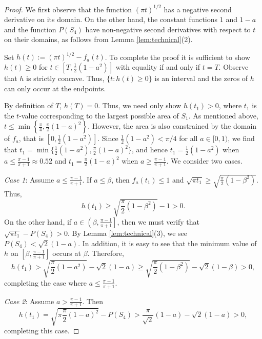 \documentclass[leqno]{article}
\numberwithin{equation}{section}
\theoremstyle{definition}
\theoremstyle{remark}
\theoremstyle{plain}
\begin{document}
\begin{proof} 
We first observe that the function $(\pi t)^{1/2}$ has a negative second derivative on its domain.  On the other hand, the constant functions $1$ and $1-a$ and the function $P(S_4)$ have non-negative second derivatives with respect to $t$ on their domains, as follows from Lemma \ref{lem:technical}(2).

Set $h(t):=(\pi t)^{1/2} - f_a(t)$.  To complete the proof it is sufficient to show $h(t)\geq 0$ for $t\in \left[T,\frac{1}{2}(1-a^2)\right]$ with equality if and only if $t = T$.  Observe that $h$ is strictly concave. Thus, $\{t:h(t)\geq 0\}$ is an interval and the zeros of $h$ can only occur at the endpoints.

By definition of $T$, $h(T) = 0$.  Thus, we need only show $h(t_1) > 0$, where $t_1$ is the $t$-value corresponding to the largest possible area of $S_1$.  As mentioned above, $t\leq \min\left\{\frac{\pi}{4}, \frac{\pi}{2}(1-a)^2\right\}$. However, the area is also constrained by the domain of $f_a$, that is $\left[0,\frac{1}{2}(1-a^2)\right]$.  Since $\frac{1}{2}(1-a^2) < \pi/4$ for all $a\in[0,1)$, we find that $t_1 = \min \{ \frac{1}{2}(1-a^2), \frac{\pi}{2}(1-a)^2\}$, and hence $t_1 = \frac{1}{2}(1-a^2)$ when $a\leq \frac{\pi-1}{\pi+1}\approx 0.52$ and $t_1 = \frac{\pi}{2}(1-a)^2$ when $a\geq \frac{\pi-1}{\pi+1}$.   We consider two cases.


\textit{Case 1}: Assume $a\leq \frac{\pi-1}{\pi+1}$. If $a\leq \beta$, then $f_a(t_1)\leq 1$ and $\sqrt{\pi t_1} \geq \sqrt{\frac{\pi}{2}(1-\beta^2)}$. Thus, $$h(t_1) \geq \sqrt{\frac{\pi}{2}(1-\beta^2)} - 1 > 0.$$    On the other hand, if $a\in \left(\beta, \frac{\pi-1}{\pi+1}\right]$, then we must verify that $\sqrt{\pi t_1} - P(S_4)>0$.  By Lemma \ref{lem:technical}(3), we see $P(S_4) < \sqrt{2}(1-a)$.  In addition, it is easy to see that the minimum value of $h$ on $[\beta, \frac{\pi-1}{\pi+1}]$ occurs at $\beta$.  Therefore, $$h(t_1) > \sqrt{\frac{\pi}{2}(1-a^2)} - \sqrt{2}(1-a) \geq \sqrt{\frac{\pi}{2}(1-\beta^2)} - \sqrt{2}(1-\beta) > 0,$$ completing the case where $a\leq \frac{\pi-1}{\pi+1}$.

\textit{Case 2}: Assume $a> \frac{\pi-1}{\pi+1}$.  Then $$h(t_1) = \sqrt{\pi \frac{\pi}{2}(1-a)^2} - P(S_4) > \frac{\pi}{\sqrt{2}}(1-a) - \sqrt{2}(1-a) > 0,$$ completing this case.

\end{proof}
\end{document}
